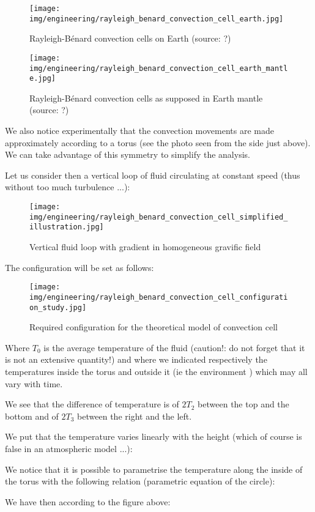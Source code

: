 	\begin{figure}[H]
		\centering
		\texttt{[image: img/engineering/rayleigh\_benard\_convection\_cell\_earth.jpg]}	
		\caption[Rayleigh-Bénard convection cells on Earth]{Rayleigh-Bénard convection cells on Earth (source: ?)}
	\end{figure}
	\begin{figure}[H]
		\centering
		\texttt{[image: img/engineering/rayleigh\_benard\_convection\_cell\_earth\_mantle.jpg]}	
		\caption[Rayleigh-Bénard convection cells as supposed in Earth mantle]{Rayleigh-Bénard convection cells as supposed in Earth mantle (source: ?)}
	\end{figure}
	We also notice experimentally that the convection movements are made approximately according to a torus (see the photo seen from the side just above). We can take advantage of this symmetry to simplify the analysis.
	
	Let us consider then a vertical loop of fluid circulating at constant speed (thus without too much turbulence ...):
	\begin{figure}[H]
		\centering
		\texttt{[image: img/engineering/rayleigh\_benard\_convection\_cell\_simplified\_illustration.jpg]}	
		\caption{Vertical fluid loop with gradient in homogeneous gravific field}
	\end{figure}
	The configuration will be set as follows:
	\begin{figure}[H]
		\centering
		\texttt{[image: img/engineering/rayleigh\_benard\_convection\_cell\_configuration\_study.jpg]}	
		\caption{Required configuration for the theoretical model of convection cell}
	\end{figure}
	Where $T_0$ is the average temperature of the fluid (caution!: do not forget that it is not an extensive quantity!) and where we indicated respectively the temperatures inside the torus and outside it (ie the environment ) which may all vary with time.

	We see that the difference of temperature is of $2T_2$ between the top and the bottom and of $2T_3$ between the right and the left.

	We put that the temperature varies linearly with the height (which of course is false in an atmospheric model ...):
	
	We notice that it is possible to parametrise the temperature along the inside of the torus with the following relation (parametric equation of the circle):
	
	We have then according to the figure above:
	

